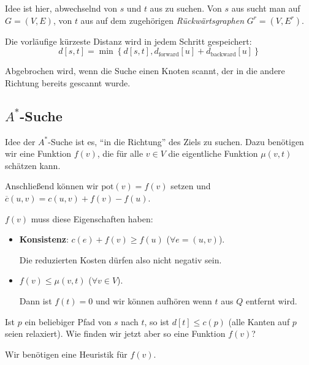 Idee ist hier, abwechselnd von \( s \) und \( t \) aus zu suchen. Von \( s \) aus sucht man auf \( G = (V,E) \), von \( t \) aus auf dem zugehörigen \emph{Rückwärtsgraphen} \( G^r = (V,E^r) \).

Die vorläufige kürzeste Distanz wird in jedem Schritt gespeichert:
\begin{equation*}
  d[s,t] = \min\left \{ d[s,t],d_\text{forward}[u] + d_\text{backward}[u] \right \}
\end{equation*}

Abgebrochen wird, wenn die Suche einen Knoten scannt, der in die andere Richtung bereits gescannt wurde.

\subsection{\( A^\ast \)-Suche}

Idee der \( A^\ast \)-Suche ist es, ``in die Richtung'' des Ziels zu suchen. Dazu benötigen wir eine Funktion \( f(v) \), die für alle \( v \in V \) die eigentliche Funktion \( \mu(v,t) \) schätzen kann.

Anschließend können wir \( \text{pot}(v) = f(v) \) setzen und \( \overline{c}(u,v) = c(u,v) + f(v) - f(u) \).

\( f(v) \) muss diese Eigenschaften haben:
\begin{itemize}
  \item \textbf{Konsistenz}: \( c(e) + f(v) \geq f(u) \) (\( \forall e = (u,v) \)). 

  Die reduzierten Kosten dürfen also nicht negativ sein.

  \item \( f(v) \leq \mu(v,t) \) (\( \forall v \in V \)).

  Dann ist \( f(t) = 0 \) und wir können aufhören wenn \( t \) aus \( Q \) entfernt wird.
\end{itemize}

Ist \( p \) ein beliebiger Pfad von \( s \) nach \( t \), so ist \( d[t] \leq c(p) \) (alle Kanten auf \( p \) seien relaxiert). Wie finden wir jetzt aber so eine Funktion \( f(v) \)?

Wir benötigen eine Heuristik für \( f(v) \).

